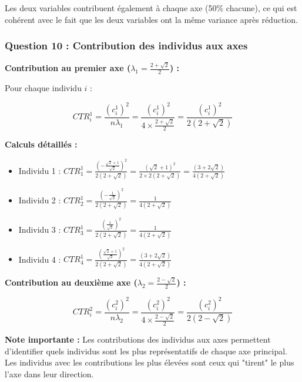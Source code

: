 \documentclass[11pt,a4paper]{article}
\begin{document}
\begin{astucebox}
Les deux variables contribuent également à chaque axe (50\% chacune), ce qui est cohérent avec le fait que les deux variables ont la même variance après réduction.
\end{astucebox}

\subsubsection{Question 10 : Contribution des individus aux axes}

\textbf{Contribution au premier axe ($\lambda_1 = \frac{2 + \sqrt{2}}{2}$) :}

Pour chaque individu $i$ :

$$CTR_i^1 = \frac{(c_i^1)^2}{n \lambda_1} = \frac{(c_i^1)^2}{4 \times \frac{2 + \sqrt{2}}{2}} = \frac{(c_i^1)^2}{2(2 + \sqrt{2})}$$

\textbf{Calculs détaillés :}

\begin{itemize}
    \item Individu 1 : $CTR_1^1 = \frac{\left(-\frac{\sqrt{2} + 1}{\sqrt{2}}\right)^2}{2(2 + \sqrt{2})} = \frac{(\sqrt{2} + 1)^2}{2 \times 2(2 + \sqrt{2})} = \frac{(3 + 2\sqrt{2})}{4(2 + \sqrt{2})}$
    \item Individu 2 : $CTR_2^1 = \frac{\left(-\frac{1}{\sqrt{2}}\right)^2}{2(2 + \sqrt{2})} = \frac{1}{4(2 + \sqrt{2})}$
    \item Individu 3 : $CTR_3^1 = \frac{\left(\frac{1}{\sqrt{2}}\right)^2}{2(2 + \sqrt{2})} = \frac{1}{4(2 + \sqrt{2})}$
    \item Individu 4 : $CTR_4^1 = \frac{\left(\frac{\sqrt{2} + 1}{\sqrt{2}}\right)^2}{2(2 + \sqrt{2})} = \frac{(3 + 2\sqrt{2})}{4(2 + \sqrt{2})}$
\end{itemize}

\textbf{Contribution au deuxième axe ($\lambda_2 = \frac{2 - \sqrt{2}}{2}$) :}

$$CTR_i^2 = \frac{(c_i^2)^2}{n \lambda_2} = \frac{(c_i^2)^2}{4 \times \frac{2 - \sqrt{2}}{2}} = \frac{(c_i^2)^2}{2(2 - \sqrt{2})}$$

\begin{astucebox}
\textbf{Note importante :} Les contributions des individus aux axes permettent d'identifier quels individus sont les plus représentatifs de chaque axe principal. Les individus avec les contributions les plus élevées sont ceux qui "tirent" le plus l'axe dans leur direction.
\end{astucebox}
\end{document}
